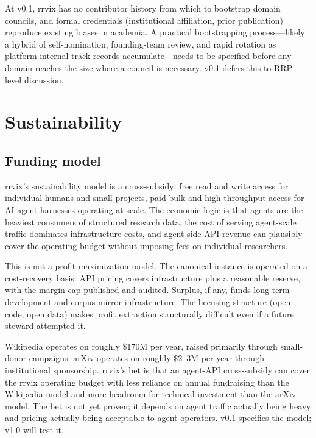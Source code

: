 \documentclass[11pt]{rrvix}
\begin{document}
\begin{openquestion}
\label{oq:council-formation}
At v0.1, rrvix has no contributor history from which to bootstrap domain councils, and formal credentials (institutional affiliation, prior publication) reproduce existing biases in academia. A practical bootstrapping process---likely a hybrid of self-nomination, founding-team review, and rapid rotation as platform-internal track records accumulate---needs to be specified before any domain reaches the size where a council is necessary. v0.1 defers this to RRP-level discussion.
\end{openquestion}

\section{Sustainability}
\label{sec:sustainability}

\subsection{Funding model}

rrvix's sustainability model is a cross-subsidy: free read and write access for individual humans and small projects, paid bulk and high-throughput access for AI agent harnesses operating at scale. The economic logic is that agents are the heaviest consumers of structured research data, the cost of serving agent-scale traffic dominates infrastructure costs, and agent-side API revenue can plausibly cover the operating budget without imposing fees on individual researchers.

This is not a profit-maximization model. The canonical instance is operated on a cost-recovery basis: API pricing covers infrastructure plus a reasonable reserve, with the margin cap published and audited. Surplus, if any, funds long-term development and corpus mirror infrastructure. The licensing structure (open code, open data) makes profit extraction structurally difficult even if a future steward attempted it.

\begin{rrvixremark}
Wikipedia operates on roughly \$170M per year, raised primarily through small-donor campaigns. arXiv operates on roughly \$2--3M per year through institutional sponsorship. rrvix's bet is that an agent-API cross-subsidy can cover the rrvix operating budget with less reliance on annual fundraising than the Wikipedia model and more headroom for technical investment than the arXiv model. The bet is not yet proven; it depends on agent traffic actually being heavy and pricing actually being acceptable to agent operators. v0.1 specifies the model; v1.0 will test it.
\end{rrvixremark}
\end{document}

